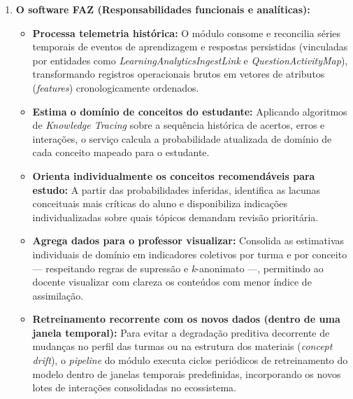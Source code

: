 \begin{enumerate}
    \item \textbf{O software FAZ (Responsabilidades funcionais e analíticas):}
    \begin{itemize}
        \item \textbf{Processa telemetria histórica:} O módulo consome e reconcilia séries temporais de eventos de aprendizagem e respostas persistidas (vinculadas por entidades como \textit{LearningAnalyticsIngestLink} e \textit{QuestionActivityMap}), transformando registros operacionais brutos em vetores de atributos (\textit{features}) cronologicamente ordenados.
        \item \textbf{Estima o domínio de conceitos do estudante:} Aplicando algoritmos de \textit{Knowledge Tracing} sobre a sequência histórica de acertos, erros e interações, o serviço calcula a probabilidade atualizada de domínio de cada conceito mapeado para o estudante.
        \item \textbf{Orienta individualmente os conceitos recomendáveis para estudo:} A partir das probabilidades inferidas, identifica as lacunas conceituais mais críticas do aluno e disponibiliza indicações individualizadas sobre quais tópicos demandam revisão prioritária.
        \item \textbf{Agrega dados para o professor visualizar:} Consolida as estimativas individuais de domínio em indicadores coletivos por turma e por conceito — respeitando regras de supressão e \textit{k}-anonimato —, permitindo ao docente visualizar com clareza os conteúdos com menor índice de assimilação.
        \item \textbf{Retreinamento recorrente com os novos dados (dentro de uma janela temporal):} Para evitar a degradação preditiva decorrente de mudanças no perfil das turmas ou na estrutura dos materiais (\textit{concept drift}), o \textit{pipeline} do módulo executa ciclos periódicos de retreinamento do modelo dentro de janelas temporais predefinidas, incorporando os novos lotes de interações consolidadas no ecossistema.
    \end{itemize}


\end{enumerate}
